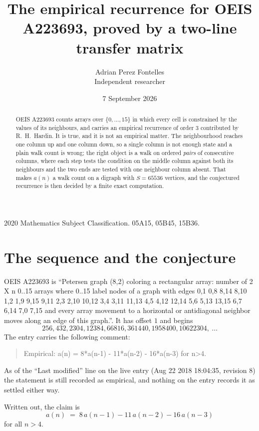 \documentclass[11pt,a4paper]{article}
\title{The empirical recurrence for OEIS A223693, proved by a two-line transfer matrix}
\author{Adrian Perez Fontelles\\ \small Independent researcher}
\date{7 September 2026}
\theoremstyle{plain}
\theoremstyle{definition}
\begin{document}
\maketitle

\begin{abstract}
OEIS A223693 counts arrays over $\{0,\dots,15\}$ in which every cell is constrained by the
values of its neighbours, and carries an empirical recurrence of order $3$ contributed
by R.~H.~Hardin. It is true, and it is not an empirical matter. The neighbourhood reaches one
column up and one column down, so a single column is not enough state and a plain walk count
is wrong; the right object is a walk on ordered \emph{pairs} of consecutive columns, where
each step tests the condition on the middle column against both its neighbours and the two
ends are tested with one neighbour column absent. That makes $a(n)$ a walk count on a digraph
with $S=65536$ vertices, and the conjectured recurrence is then decided by a finite exact
computation.
\end{abstract}

\noindent\small 2020 Mathematics Subject Classification. 05A15, 05B45, 15B36.\normalsize

\section{The sequence and the conjecture}

OEIS A223693 is ``Petersen graph (8,2) coloring a rectangular array: number of 2 X n 0..15 arrays where 0..15 label nodes of a graph with edges 0,1 0,8 8,14 8,10 1,2 1,9 9,15 9,11 2,3 2,10 10,12 3,4 3,11 11,13 4,5 4,12 12,14 5,6 5,13 13,15 6,7 6,14 7,0 7,15 and every array movement to a horizontal or antidiagonal neighbor moves along an edge of this graph.''. It has offset $1$ and begins
\[
256, 432, 2304, 12384, 66816, 361440, 1958400, 10622304,\ \dots
\]
The entry carries the following comment:
\begin{quote}\small
Empirical: a(n) = 8*a(n-1) - 11*a(n-2) - 16*a(n-3) for n>4.
\end{quote}
As of the ``Last modified'' line on the live entry (Aug 22 2018 18:04:35, revision 8) the statement is
still recorded as empirical, and nothing on the entry records it as settled either way.

Written out, the claim is
\begin{equation}\label{eq:conj}
a(n)\;=\;8\,a(n-1) - 11\,a(n-2) - 16\,a(n-3)
\end{equation}
for all $n>4$.
\end{document}

